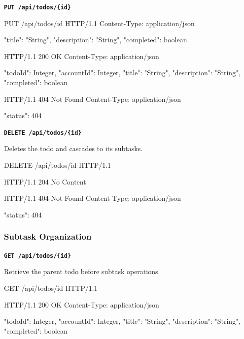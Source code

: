 \medskip
\textbf{\texttt{PUT /api/todos/\{id\}}}

\begin{httpexchange}
\begin{httplisting}
PUT /api/todos/{id} HTTP/1.1
Content-Type: application/json

{
    "title": "String",
    "description": "String",
    "completed": boolean
}
\end{httplisting}
\httpmidarrows
\begin{httplisting}
HTTP/1.1 200 OK
Content-Type: application/json

{
    "todoId": Integer,
    "accountId": Integer,
    "title": "String",
    "description": "String",
    "completed": boolean
}

HTTP/1.1 404 Not Found
Content-Type: application/json

{
    "status": 404
}
\end{httplisting}
\end{httpexchange}

\medskip
\textbf{\texttt{DELETE /api/todos/\{id\}}}

\noindent Deletes the todo and cascades to its subtasks.

\begin{httpexchange}
\begin{httplisting}
DELETE /api/todos/{id} HTTP/1.1
\end{httplisting}
\httpmidarrows
\begin{httplisting}
HTTP/1.1 204 No Content

HTTP/1.1 404 Not Found
Content-Type: application/json

{
    "status": 404
}
\end{httplisting}
\end{httpexchange}

\newpage



\subsubsection{Subtask Organization}
\textbf{\texttt{GET /api/todos/\{id\}}}

Retrieve the parent todo before subtask operations.

\begin{httpexchange}
\begin{httplisting}
GET /api/todos/{id} HTTP/1.1
\end{httplisting}
\httpmidarrows
\begin{httplisting}
HTTP/1.1 200 OK
Content-Type: application/json

{
    "todoId": Integer,
    "accountId": Integer,
    "title": "String",
    "description": "String",
    "completed": boolean
}
\end{httplisting}
\end{httpexchange}

